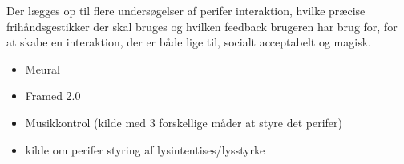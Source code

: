  Der lægges op til flere undersøgelser af perifer interaktion, hvilke præcise frihåndsgestikker der skal bruges og hvilken feedback brugeren har brug for, for at skabe en interaktion, der er både lige til, socialt acceptabelt og magisk.




%
\begin{itemize}
  \item Meural \parencite{WEB:Meural}
  \item Framed 2.0 
  \item Musikkontrol (kilde med 3 forskellige måder at styre det perifer)
  \item kilde om perifer styring af lysintentises/lysstyrke
\end{itemize}

